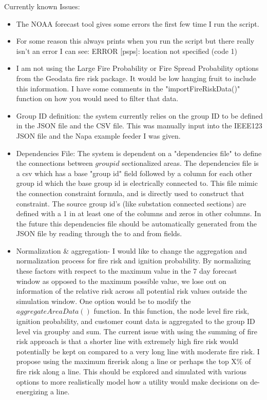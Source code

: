 \documentclass{article}
\begin{document}
Currently known Issues:
\begin{itemize}
\item The NOAA forecast tool gives some errors the first few time I run the script. 
\item  For some reason this always prints when you run the script but there really isn't an error I can see: ERROR [psps]: location not specified (code 1)
\item I am not using the Large Fire Probability or Fire Spread Probability options from the Geodata fire risk package. It would be low hanging fruit to include this information. I have some comments in the "importFireRiskData()" function on how you would need to filter that data.
\item Group ID definition: the system currently relies on the group ID to be defined in the JSON file and the CSV file. This was manually input into the IEEE123 JSON file and the Napa example feeder I was given. 
\item Dependencies File: The system is dependent on a "dependencies file" to define the connections between $group id$ sectionalized areas. The dependencies file is a csv which has a base "group id" field followed by a column for each other group id which the base group id is electrically connected to. This file mimic the connection constraint formula, and is directly used to construct that constraint. The source group id's (like substation connected sections) are defined with a 1 in at least one of the columns and zeros in other columns. In the future this dependencies file should be automatically generated from the JSON file by reading through the to and from fields. 
\item Normalization & aggregation-  I would like to change the aggregation and normalization process for fire risk and ignition probability. By normalizing these factors with respect to the maximum value in the 7 day forecast window as opposed to the maximum possible value, we lose out on information of the relative risk across all potential risk values outside the simulation window. One option would be to modify the $aggregateAreaData()$ function. In this function, the node level fire risk, ignition probability, and customer count data is aggregated to the group ID level via groupby and sum. The current issue with using the summing of fire risk approach is that a shorter line with extremely high fire risk  would potentially be kept on compared to a very long line with moderate fire risk. I propose using the maximum firerisk along a line or perhaps the top X\% of fire risk along a line. This should be explored and simulated with various options to more realistically model how a utility would make decisions on de-energizing a line. 

\end{itemize}
\end{document}

